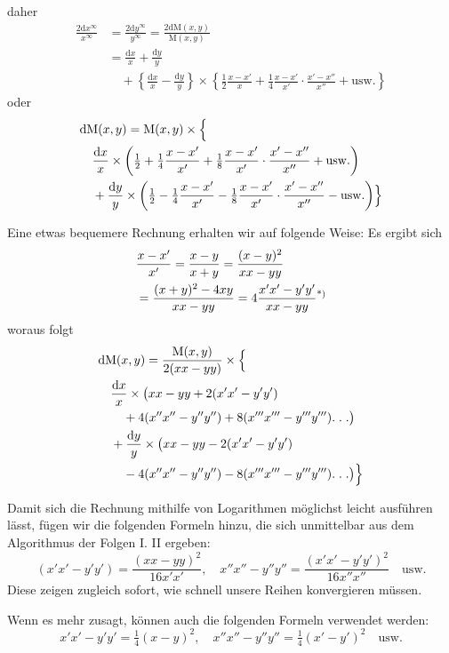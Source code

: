 daher
\[
\begin{aligned}
\frac{2\mathrm{d}x^\infty}{x^\infty}
&=\frac{2\mathrm{d}y^\infty}{y^\infty}
=\frac{2\mathrm{d}\mathrm{M}(x,y)}{\mathrm{M}(x,y)}\\[7pt]
&=\frac{\mathrm{d}x}{x}+\frac{\mathrm{d}y}{y}\\&\quad+\left\{\frac{\mathrm{d}x}{x}-\frac{\mathrm{d}y}{y}\right\}\times
\left\{\tfrac12\frac{x-x'}{x}+\tfrac14\frac{x-x'}{x'}\cdot\frac{x'-x''}{x''}+\mathrm{usw.}\right\}
\end{aligned}
\]
oder
\[
\begin{aligned}
&\mathrm{d}\mathrm{M}(x,y)=\mathrm{M}(x,y)\times\Bigl\{\\&\quad\frac{\mathrm{d}x}{x}\times\left(\tfrac12+\tfrac14\frac{x-x'}{x'}+\tfrac18\frac{x-x'}{x'}\cdot\frac{x'-x''}{x''}+\mathrm{usw.}\right)\\&\quad+\frac{\mathrm{d}y}{y}\times\left(\tfrac12-\tfrac14\frac{x-x'}{x'}-\tfrac18\frac{x-x'}{x'}\cdot\frac{x'-x''}{x''}-\mathrm{usw.}\right)\Bigr\}
\end{aligned}
\]
\par Eine etwas bequemere Rechnung erhalten wir auf folgende Weise: Es ergibt sich
\[
\begin{aligned}&\frac{x-x'}{x'}=\frac{x-y}{x+y}=\frac{(x-y)^2}{xx-yy}\\&=\frac{(x+y)^2-4xy}{xx-yy}=4\frac{x'x'-y'y'}{xx-yy}\text{\textsuperscript{*)}}\end{aligned}
\]
woraus folgt
\[
\begin{aligned}
&\mathrm{d}\mathrm{M}(x,y)=\frac{\mathrm{M}(x,y)}{2(xx-yy)}\times\Bigl\{\\&\quad\frac{\mathrm{d}x}{x}\times\bigl(xx-yy+2(x'x'-y'y')\\&\qquad+4(x''x''-y''y'')+8(x'''x'''-y'''y''').\;.\;.\bigr)\\&\quad+\frac{\mathrm{d}y}{y}\times\bigl(xx-yy-2(x'x'-y'y')\\&\qquad-4(x''x''-y''y'')-8(x'''x'''-y'''y''').\;.\;.\bigr)\Bigr\}
\end{aligned}
\]
\par 
Damit sich die Rechnung mithilfe von Logarithmen möglichst leicht ausführen lässt, fügen wir die folgenden Formeln hinzu, die sich unmittelbar aus dem Algorithmus der Folgen I. II ergeben:
\[
(x'x'-y'y')=\frac{(xx-yy)^2}{16x'x'},\quad
x''x''-y''y''=\frac{(x'x'-y'y')^2}{16x''x''}\quad\mathrm{usw.}
\]
Diese zeigen zugleich sofort, wie schnell unsere Reihen konvergieren müssen.

\par Wenn es mehr zusagt, können auch die folgenden Formeln verwendet werden:
\[
x'x'-y'y'=\tfrac14(x-y)^2,\quad
x''x''-y''y''=\tfrac14(x'-y')^2\quad\mathrm{usw.}
\]

\clearpage
\endgroup
